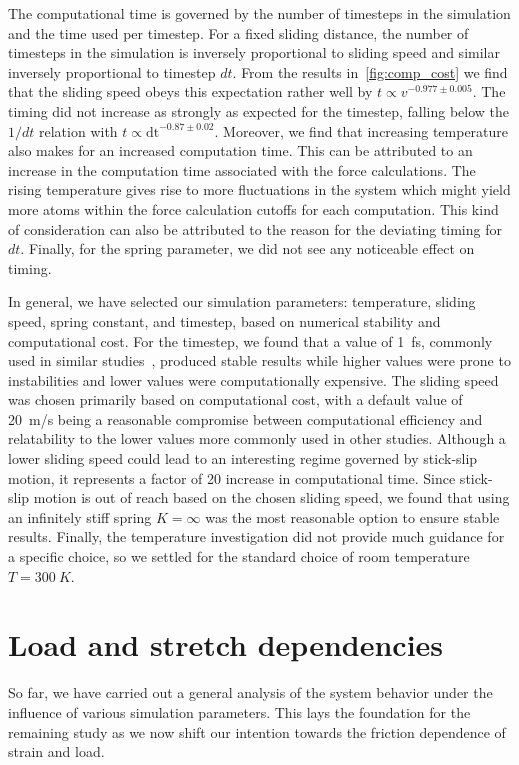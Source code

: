 The computational time is governed by the number of timesteps in the simulation
and the time used per timestep. For a fixed sliding distance, the number of timesteps in the simulation is inversely proportional
to sliding speed and similar inversely proportional to timestep $dt$. From the
results in~\cref{fig:comp_cost} we find that the sliding speed obeys this
expectation rather well by $t \propto v^{-0.977 \pm 0.005}$. The timing did not increase as strongly as expected for the timestep, falling below the $1/dt$ relation with $t
\propto \text{dt}^{-0.87\pm 0.02}$. Moreover, we find that increasing
temperature also makes for an increased computation time. This can be attributed
to an increase in the computation time associated with the force calculations. The
rising temperature gives rise to more fluctuations in the system which might
yield more atoms within the force calculation cutoffs for each computation. This kind of consideration can also be attributed to the reason for the deviating timing for $dt$. Finally, for the spring parameter, we did not see any noticeable effect on timing.


In general, we have selected our simulation parameters: temperature, sliding speed, spring constant, and timestep, based on numerical stability
and computational cost. For the timestep, we found that a value of \SI{1}{fs},
commonly used in similar studies~\cite{liu_high-speed_2014, zhu_study_2018},
produced stable results while higher values were prone to instabilities and
lower values were computationally expensive. The sliding speed was chosen primarily based on computational cost, with a default value of \SI{20}{m/s} being a reasonable compromise between computational efficiency and relatability to the lower values more commonly used in other studies. Although a lower sliding speed could lead to an interesting regime governed by stick-slip motion, it represents a factor of 20 increase in computational time. Since stick-slip motion is out of reach based on the chosen sliding speed, we found that using an infinitely stiff spring $K = \infty$ was the most reasonable option to ensure stable results. Finally, the temperature investigation did not provide much guidance for a specific choice, so we settled for the standard choice of room temperature $T = \SI{300}{K}$.



\section{Load and stretch dependencies}\label{sec:load_and_stretch}
So far, we have carried out a general analysis of the system behavior under the influence of various simulation parameters. This lays the foundation for the remaining study as we now shift our intention towards the friction dependence of strain and load.

